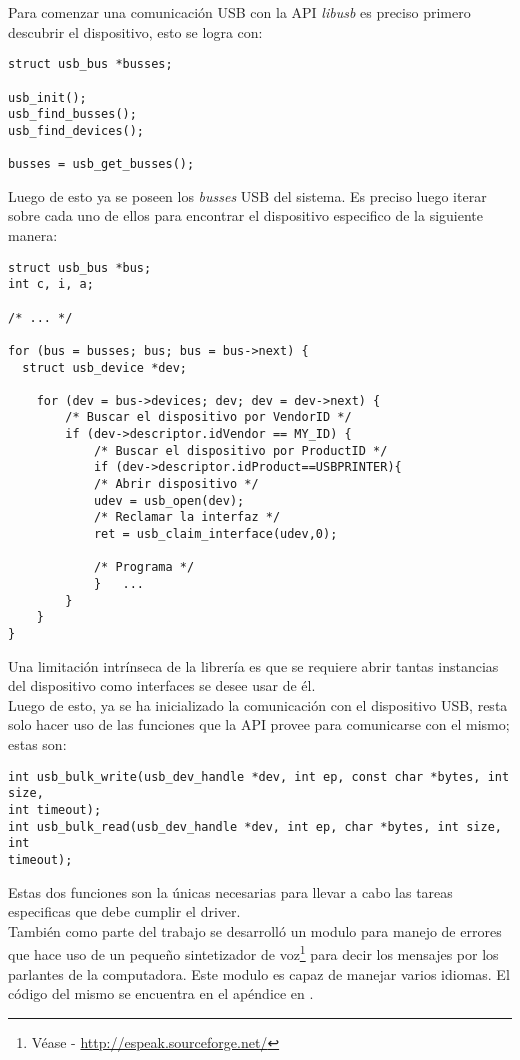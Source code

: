 
Para comenzar una comunicaci\'on USB con la API \emph{libusb} es preciso
primero descubrir el dispositivo, esto se logra con:

\begin{lstlisting}
struct usb_bus *busses;
    
usb_init();
usb_find_busses();
usb_find_devices();
    
busses = usb_get_busses();
\end{lstlisting}

Luego de esto ya se poseen los \emph{busses} USB del sistema. Es preciso luego
iterar sobre cada uno de ellos para encontrar el dispositivo especifico de la
siguiente manera:

\begin{lstlisting}
struct usb_bus *bus;
int c, i, a;
    
/* ... */
    
for (bus = busses; bus; bus = bus->next) {
  struct usb_device *dev;
    
    for (dev = bus->devices; dev; dev = dev->next) {
        /* Buscar el dispositivo por VendorID */
        if (dev->descriptor.idVendor == MY_ID) {
            /* Buscar el dispositivo por ProductID */
            if (dev->descriptor.idProduct==USBPRINTER){
            /* Abrir dispositivo */
            udev = usb_open(dev);
            /* Reclamar la interfaz */
            ret = usb_claim_interface(udev,0); 

            /* Programa */
            }	...
        }
    }
}
\end{lstlisting}

Una limitaci\'on intr\'inseca de la librer\'ia es que se requiere abrir tantas
instancias del dispositivo como interfaces se desee usar de \'el.\\

Luego de esto, ya se ha inicializado la comunicaci\'on con el dispositivo USB,
resta solo hacer uso de las funciones que la API provee para comunicarse con
el mismo; estas son:

\begin{lstlisting}
int usb_bulk_write(usb_dev_handle *dev, int ep, const char *bytes, int size,
int timeout);
int usb_bulk_read(usb_dev_handle *dev, int ep, char *bytes, int size, int
timeout);
\end{lstlisting}

Estas dos funciones son la \'unicas necesarias para llevar a cabo las tareas
especificas que debe cumplir el driver.\\

Tambi\'en como parte del trabajo se desarroll\'o un modulo para manejo de
errores que hace uso de un peque\~no sintetizador de voz\footnote{V\'ease -
\url{http://espeak.sourceforge.net/}} para decir los mensajes por los parlantes
de la computadora. Este modulo es capaz de manejar varios idiomas. El c\'odigo
del mismo se encuentra en el ap\'endice en .